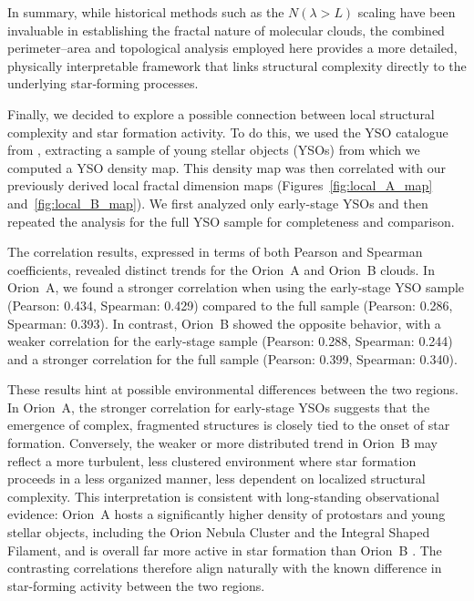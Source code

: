 In summary, while historical methods such as the \( N(\lambda > L) \) scaling have been invaluable in establishing the fractal nature of molecular clouds, the combined perimeter–area and topological analysis employed here provides a more detailed, physically interpretable framework that links structural complexity directly to the underlying star‑forming processes.

Finally, we decided to explore a possible connection between local structural complexity and star formation activity. To do this, we used the YSO catalogue from \cite{megeath2012catalogue}, extracting a sample of young stellar objects (YSOs) from which we computed a YSO density map. This density map was then correlated with our previously derived local fractal dimension maps (Figures~\ref{fig:local_A_map} and~\ref{fig:local_B_map}). We first analyzed only early-stage YSOs and then repeated the analysis for the full YSO sample for completeness and comparison.

The correlation results, expressed in terms of both Pearson and Spearman coefficients, revealed distinct trends for the Orion~A and Orion~B clouds. In Orion~A, we found a stronger correlation when using the early-stage YSO sample (Pearson: 0.434, Spearman: 0.429) compared to the full sample (Pearson: 0.286, Spearman: 0.393). In contrast, Orion~B showed the opposite behavior, with a weaker correlation for the early-stage sample (Pearson: 0.288, Spearman: 0.244) and a stronger correlation for the full sample (Pearson: 0.399, Spearman: 0.340).

These results hint at possible environmental differences between the two regions.  
In Orion~A, the stronger correlation for early-stage YSOs suggests that the emergence of complex, fragmented structures is closely tied to the onset of star formation.  
Conversely, the weaker or more distributed trend in Orion~B may reflect a more turbulent, less clustered environment where star formation proceeds in a less organized manner, less dependent on localized structural complexity.  
This interpretation is consistent with long-standing observational evidence: Orion~A hosts a significantly higher density of protostars and young stellar objects, including the Orion Nebula Cluster and the Integral Shaped Filament, and is overall far more active in star formation than Orion~B \cite{megeath2012catalogue}.  
The contrasting correlations therefore align naturally with the known difference in star-forming activity between the two regions.

